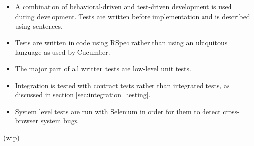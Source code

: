 
\begin{itemize}
    \item A combination of behavioral-driven and test-driven development
          is used during development. Tests are written before
          implementation and is described using sentences.
    \item Tests are written in code using RSpec rather than using an
          ubiquitous language as used by Cucumber.
    \item The major part of all written tests are low-level unit tests.
    \item Integration is tested with contract tests rather than integrated
          tests, as discussed in section \ref{sec:integration_testing}.
    \item System level tests are run with Selenium in order for them
          to detect cross-browser system bugs.
\end{itemize}

(wip)
